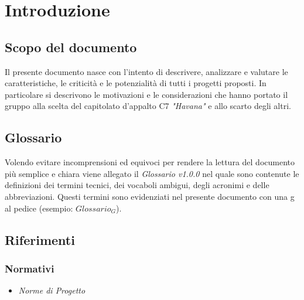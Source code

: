 \section{Introduzione}
	\subsection{Scopo del documento}
	Il presente documento nasce con l'intento di descrivere, analizzare e valutare le caratteristiche, le criticità e le potenzialità di tutti i progetti proposti. In particolare si descrivono le motivazioni e le considerazioni che hanno portato il gruppo alla scelta del capitolato d'appalto C7 \emph{"Havana"} e allo scarto degli altri.
	\subsection{Glossario}
	Volendo evitare incomprensioni  ed equivoci per rendere la lettura del documento più semplice e chiara viene allegato il \emph{Glossario v1.0.0} nel quale sono contenute le definizioni dei termini tecnici, dei vocaboli ambigui, degli acronimi e delle abbreviazioni. Questi termini sono evidenziati nel presente documento con una g al pedice (esempio: $Glossario_{G}$).  
	\subsection{Riferimenti}
		\subsubsection{Normativi}
		\begin{itemize}
			\item \emph{Norme di Progetto}
		\end{itemize}
		
